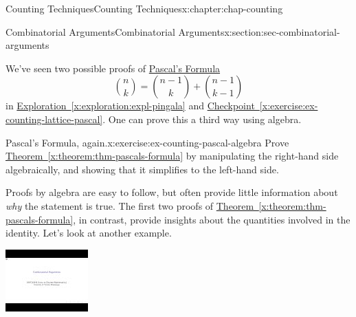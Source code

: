 \documentclass[oneside,10pt,]{book}
\newcommand{\xreffont}{\relax}
\numberwithin{equation}{section}
\newlength{\qrsize}
\newlength{\previewwidth}
\begin{document}
\begin{chapterptx}{Counting Techniques}{}{Counting Techniques}{}{}{x:chapter:chap-counting}
\begin{sectionptx}{Combinatorial Arguments}{}{Combinatorial Arguments}{}{}{x:section:sec-combinatorial-arguments}
\par
We've seen two possible proofs of \hyperref[x:theorem:thm-pascals-formula]{Pascal's Formula}%
\begin{equation*}
\binom{n}{k} = \binom{n-1}{k} + \binom{n-1}{k-1}
\end{equation*}
in \hyperref[x:exploration:expl-pingala]{Exploration~{\xreffont\ref{x:exploration:expl-pingala}}} and \hyperref[x:exercise:ex-counting-lattice-pascal]{Checkpoint~{\xreffont\ref{x:exercise:ex-counting-lattice-pascal}}}. One can prove this a third way using algebra.%
\begin{inlineexercise}{Pascal's Formula, again.}{x:exercise:ex-counting-pascal-algebra}%
Prove \hyperref[x:theorem:thm-pascals-formula]{Theorem~{\xreffont\ref{x:theorem:thm-pascals-formula}}} by manipulating the right-hand side algebraically, and showing that it simplifies to the left-hand side.%
\end{inlineexercise}%
Proofs by algebra are easy to follow, but often provide little information about \emph{why} the statement is true. The first two proofs of \hyperref[x:theorem:thm-pascals-formula]{Theorem~{\xreffont\ref{x:theorem:thm-pascals-formula}}}, in contrast, provide insights about the quantities involved in the identity. Let's look at another example.%
\begin{sidebyside}{1}{0}{0}{0}%
\begin{sbspanel}{1}%
\setlength{\qrsize}{9em}
\setlength{\previewwidth}{\linewidth}
\addtolength{\previewwidth}{-\qrsize}
\begin{tcbraster}[raster columns=2, raster column skip=1pt, raster halign=center, raster force size=false, raster left skip=0pt, raster right skip=0pt]%
\begin{tcolorbox}[previewstyle, width=\previewwidth]%
\includegraphics[width=0.80\linewidth,height=\qrsize,keepaspectratio]{images/video-combinatorial-arguments.jpg}%

\end{tcolorbox}
\end{tcbraster}
\end{sbspanel}
\end{sidebyside}
\end{sectionptx}
\end{chapterptx}
\end{document}
